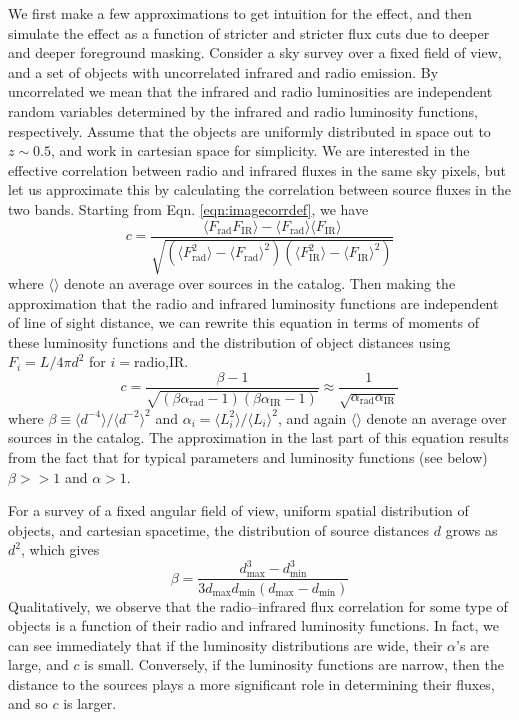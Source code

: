 \documentclass{emulateapj}
\newcommand{\mintext}{\text{min}}
\newcommand{\maxtext}{\text{max}}
\newcommand{\rad}{\text{rad}}
\newcommand{\ir}{\text{IR}}
\begin{document}
We first make a few approximations to get intuition for the effect, and then simulate the effect as a function of stricter and stricter flux cuts due to deeper and deeper foreground masking. Consider a sky survey over a fixed field of view, and a set of objects with uncorrelated infrared and radio emission. By uncorrelated we mean that the infrared and radio luminosities are independent random variables determined by the infrared and radio luminosity functions, respectively. Assume that the objects are uniformly distributed in space out to $z\sim0.5$, and work in cartesian space for simplicity. We are interested in the effective correlation between radio and infrared fluxes in the same sky pixels, but let us approximate this by calculating the correlation between source fluxes in the two bands. Starting from Eqn. \ref{eqn:imagecorrdef}, we have
\begin{equation} %
	c = \frac{\langle F_\rad F_\ir \rangle-\langle F_\rad\rangle\langle F_\ir\rangle}{\sqrt{(\langle F_\rad^2\rangle-\langle F_\rad\rangle^2)(\langle F_\ir^2\rangle-\langle F_\ir\rangle^2)}}
\end{equation}
where $\langle\rangle$ denote an average over sources in the catalog. Then making the approximation that the radio and infrared luminosity functions are independent of line of sight distance, we can rewrite this equation in terms of moments of these luminosity functions and the distribution of object distances using $F_i=L/4\pi d^2$ for $i=$radio,IR.
\begin{equation}
\label{eqn:cresult}
	c = \frac{\beta-1}{\sqrt{(\beta\alpha_\rad-1)(\beta\alpha_\ir-1)}}\approx\frac{1}{\sqrt{\alpha_\rad \alpha_\ir}}
\end{equation}
where $\beta\equiv\langle d^{-4}\rangle/\langle d^{-2}\rangle^2$ and $\alpha_i=\langle L_i^2\rangle/\langle L_i\rangle^2$, and again $\langle\rangle$ denote an average over sources in the catalog. The approximation in the last part of this equation results from the fact that for typical parameters and luminosity functions (see below) $\beta>>1$ and $\alpha>1$. 

For a survey of a fixed angular field of view, uniform spatial distribution of objects, and cartesian spacetime, the distribution of source distances $d$ grows as $d^2$, which gives 
\begin{equation}
	\beta=\frac{d_\maxtext^3-d_\mintext^3}{3d_\maxtext d_\mintext (d_\maxtext-d_\mintext)}
\end{equation}
Qualitatively, we observe that the radio--infrared flux correlation for some type of objects is a function of their radio and infrared luminosity functions. In fact, we can see immediately that if the luminosity distributions are wide, their $\alpha$'s are large, and $c$ is small. Conversely, if the luminosity functions are narrow, then the distance to the sources plays a more significant role in determining their fluxes, and so $c$ is larger. 
\end{document}
